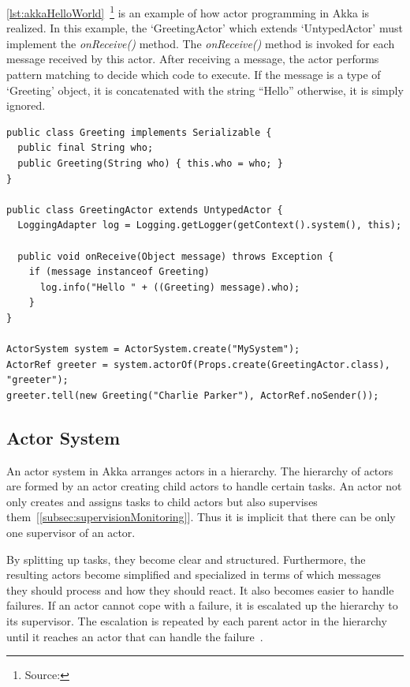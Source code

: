   \autoref{lst:akkaHelloWorld}~\footnote{Source: } is an example of how actor programming in Akka is realized. In this example, the ‘GreetingActor’ which extends ‘UntypedActor’ must implement the \emph{onReceive()} method. The \emph{onReceive()} method is invoked for each message received by this actor. After receiving a message, the actor performs pattern matching to decide which code to execute. If the message is a type of ‘Greeting’ object, it is concatenated with the string “Hello” otherwise, it is simply ignored.

\begin{lstlisting}[caption=A simple example of actor programming in Akka~\cite{akkaHome}, label=lst:akkaHelloWorld]
public class Greeting implements Serializable {
  public final String who;
  public Greeting(String who) { this.who = who; }
}

public class GreetingActor extends UntypedActor {
  LoggingAdapter log = Logging.getLogger(getContext().system(), this);

  public void onReceive(Object message) throws Exception {
    if (message instanceof Greeting)
      log.info("Hello " + ((Greeting) message).who);
    }
}

ActorSystem system = ActorSystem.create("MySystem");
ActorRef greeter = system.actorOf(Props.create(GreetingActor.class), "greeter");
greeter.tell(new Greeting("Charlie Parker"), ActorRef.noSender());
\end{lstlisting}


  \subsection{Actor System}
  \label{subsec:actorSystem}
    An actor system in Akka arranges actors in a hierarchy. The hierarchy of actors are formed by an actor creating child actors to handle certain tasks. An actor not only creates and assigns tasks to child actors but also supervises them~[\autoref{subsec:supervisionMonitoring}]. Thus it is implicit that there can be only one supervisor of an actor.

  By splitting up tasks, they become clear and structured. Furthermore, the resulting actors become simplified and specialized in terms of which messages they should process and how they should react. It also becomes easier to handle failures. If an actor cannot cope with a failure, it is escalated up the hierarchy to its supervisor. The escalation is repeated by each parent actor in the hierarchy until it reaches an actor that can handle the failure~\cite{akkaJavaDoc}.

